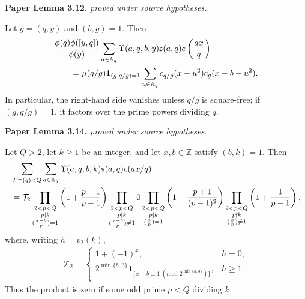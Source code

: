\begin{lemma}
\label{progression_euler_products}
\leanok
\par\medskip\noindent\textbf{Paper Lemma 3.12.} \textit{proved under source hypotheses.}\par
Let $g=(q,y)$ and $(b,g)=1$.  Then
\begin{align}
 &\frac{\phi(q)\phi([y,q])}{\phi(y)}
 \sum_{a\in\mathbb A_q}\Upsilon(a,q,b,y)
 \mathfrak s(a,q)e\left(\frac{ax}{q}\right)\notag\\
 &\qquad=\mu(q/g)\mathbf1_{(g,q/g)=1}
 \sum_{u\in\mathbb A_q}c_{q/g}(x-u^2)c_g(x-b-u^2).
\end{align}
In particular, the right-hand side vanishes unless $q/g$ is square-free;
if $(g,q/g)=1$, it factors over the prime powers dividing $q$.
\par\medskip\noindent\textbf{Paper Lemma 3.14.} \textit{proved under source hypotheses.}\par
Let $Q>2$, let $k\geq1$ be an integer, and let
$x,b\in\mathbb Z$ satisfy $(b,k)=1$.
Then
\begin{align}
 &\sum_{P^+(q)<Q}\sum_{a\in\mathbb A_q}
 \Upsilon(a,q,b,k)\mathfrak s(a,q)e(ax/q)\notag\\
 &=\mathcal T_2
 \prod_{\substack{2<p<Q\\p\mid k\\(\frac{x-b}{p})=1}}
 \left(1+\frac{p+1}{p-1}\right)
 \prod_{\substack{2<p<Q\\p\mid k\\(\frac{x-b}{p})\ne1}}0 
 \prod_{\substack{2<p<Q\\p\nmid k\\(\frac{x}{p})=1}}
 \left(1-\frac{p+1}{(p-1)^2}\right)
 \prod_{\substack{2<p<Q\\p\nmid k\\(\frac{x}{p})\ne1}}
 \left(1+\frac1{p-1}\right),
\end{align}
where, writing \(h=v_2(k)\),
\begin{align}
 \mathcal T_2=
 \begin{cases}
  1+(-1)^x,&h=0,\\
  2^{\min\{h,3\}}
  \mathbf1_{\{x-b\equiv1\;(\mathrm{mod}\;2^{\min\{h,3\}})\}},
  &h\geq1.
 \end{cases}
\end{align}
Thus the product is zero if some odd prime $p<Q$ dividing $k$

\end{lemma}
